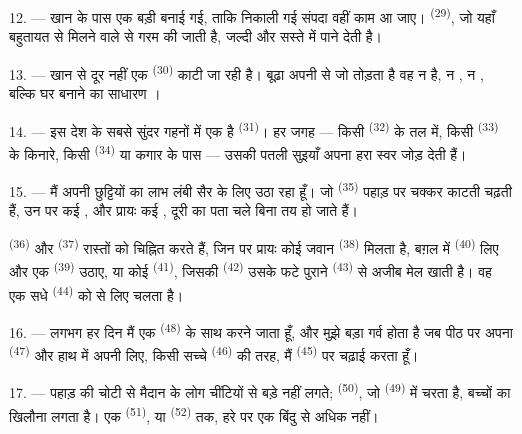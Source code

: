 12. --- खान के पास एक बड़ी  बनाई गई, ताकि निकाली गई संपदा
वहीं काम आ जाए।  \textsuperscript{(29)}, जो यहाँ बहुतायत से मिलने
वाले  से गरम की जाती है, जल्दी और सस्ते में 
पाने देती है।

13. --- खान से दूर नहीं एक  \textsuperscript{(30)} काटी जा रही है।
बूढ़ा  अपनी  से जो तोड़ता है वह न
 है, न , न , बल्कि घर बनाने
का साधारण ।

14. --- इस देश के सबसे सुंदर गहनों में एक है 
\textsuperscript{(31)}। हर जगह — किसी  \textsuperscript{(32)} के तल
में, किसी  \textsuperscript{(33)} के किनारे, किसी 
\textsuperscript{(34)} या कगार के पास — उसकी पतली सुइयाँ अपना हरा स्वर जोड़ देती
हैं।

\VUsaut{3.0mm}
\VUsaut{3.0mm}

15. --- मैं अपनी छुट्टियों का लाभ लंबी सैर के लिए उठा रहा हूँ। जो
 \textsuperscript{(35)} पहाड़ पर चक्कर काटती चढ़ती हैं, उन पर
कई , और प्रायः कई , दूरी का पता चले बिना तय हो जाते
हैं।

 \textsuperscript{(36)} और 
\textsuperscript{(37)} रास्तों को चिह्नित करते हैं, जिन पर प्रायः कोई जवान
 \textsuperscript{(38)} मिलता है, बग़ल में
 \textsuperscript{(40)} लिए और एक  \textsuperscript{(39)}
उठाए, या कोई  \textsuperscript{(41)}, जिसकी 
\textsuperscript{(42)} उसके फटे पुराने  \textsuperscript{(43)} से
अजीब मेल खाती है। वह एक सधे  \textsuperscript{(44)} को
 से लिए चलता है।

\VUsaut{3.0mm}

16. --- लगभग हर दिन मैं एक  \textsuperscript{(48)} के साथ
 करने जाता हूँ, और मुझे बड़ा गर्व होता है जब पीठ पर अपना
 \textsuperscript{(47)} और हाथ में अपनी  लिए, किसी
सच्चे  \textsuperscript{(46)} की तरह, मैं 
\textsuperscript{(45)} पर चढ़ाई करता हूँ।

17. --- पहाड़ की चोटी से मैदान के लोग चींटियों से बड़े नहीं लगते;
 \textsuperscript{(50)}, जो 
\textsuperscript{(49)} में चरता है, बच्चों का खिलौना लगता है। एक 
\textsuperscript{(51)}, या  \textsuperscript{(52)} तक,
हरे पर एक बिंदु से अधिक नहीं।


